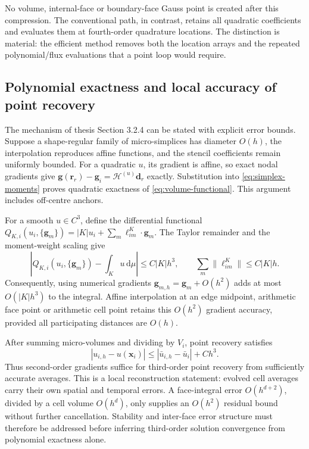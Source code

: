 \documentclass[11pt]{article}
\newcommand{\dd}{\mathrm{d}}
\begin{document}
No volume, internal-face or boundary-face Gauss point is created after this compression.  The conventional path, in contrast, retains all quadratic coefficients and evaluates them at fourth-order quadrature locations.  The distinction is material: the efficient method removes both the location arrays and the repeated polynomial/flux evaluations that a point loop would require.

\subsection{Polynomial exactness and local accuracy of point recovery}\label{sec:local-accuracy}

The mechanism of thesis Section 3.2.4 \cite{ma2026thesis} can be stated with explicit error bounds.  Suppose a shape-regular family of micro-simplices has diameter $O(h)$, the interpolation reproduces affine functions, and the stencil coefficients remain uniformly bounded.  For a quadratic $u$, its gradient is affine, so exact nodal gradients give
$\bm g(\bm r_r)-\bm g_i=\bm{\mathcal H}^{(u)}\bm d_r$ exactly.  Substitution into \eqref{eq:simplex-moments} proves quadratic exactness of \eqref{eq:volume-functional}.  This argument includes off-centre anchors.

For a smooth $u\in C^3$, define the differential functional
$Q_{K,i}(u_i,\{\bm g_m\})=|K|u_i+\sum_m\bm\ell^K_{im}\cdot\bm g_m$.
The Taylor remainder and the moment-weight scaling give
\begin{equation}
 \left|Q_{K,i}(u_i,\{\bm g_m\})-\int_Ku\,\dd\mu\right|
 \le C|K|h^3,\qquad
 \sum_m\|\bm\ell^K_{im}\|\le C|K|h.
 \label{eq:local-bound}
\end{equation}
Consequently, using numerical gradients $\bm g_{m,h}=\bm g_m+O(h^2)$ adds at most $O(|K|h^3)$ to the integral.  Affine interpolation at an edge midpoint, arithmetic face point or arithmetic cell point retains this $O(h^2)$ gradient accuracy, provided all participating distances are $O(h)$.

After summing micro-volumes and dividing by $V_i$, point recovery satisfies
\begin{equation}
 |u_{i,h}-u(\bm x_i)|
 \le |\bar u_{i,h}-\bar u_i|+Ch^3.
 \label{eq:recovery-error}
\end{equation}
Thus second-order gradients suffice for third-order point recovery from sufficiently accurate averages.  This is a local reconstruction statement: evolved cell averages carry their own spatial and temporal errors.  A face-integral error $O(h^{d+2})$, divided by a cell volume $O(h^d)$, only supplies an $O(h^2)$ residual bound without further cancellation.  Stability and inter-face error structure must therefore be addressed before inferring third-order solution convergence from polynomial exactness alone.
\end{document}
